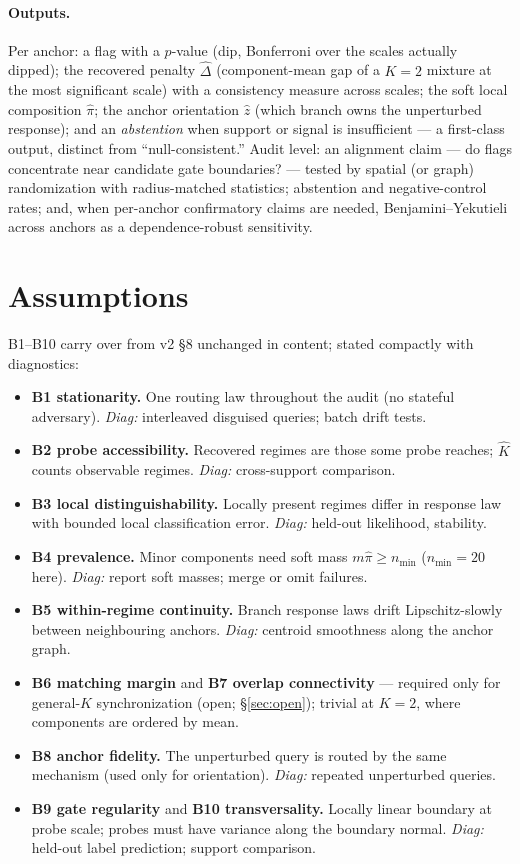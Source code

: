 \documentclass[11pt]{article}
\begin{document}
\paragraph{Outputs.}
Per anchor: a flag with a $p$-value (dip, Bonferroni over the scales actually dipped); the
recovered penalty $\widehat\Delta$ (component-mean gap of a $K{=}2$ mixture at the most
significant scale) with a consistency measure across scales; the soft local composition
$\widehat\pi$; the anchor orientation $\widehat z$ (which branch owns the unperturbed
response); and an \emph{abstention} when support or signal is insufficient --- a first-class
output, distinct from ``null-consistent.''
Audit level: an alignment claim --- do flags concentrate near candidate gate boundaries? ---
tested by spatial (or graph) randomization with radius-matched statistics; abstention and
negative-control rates; and, when per-anchor confirmatory claims are needed,
Benjamini--Yekutieli across anchors as a dependence-robust sensitivity.

\section{Assumptions}
\label{sec:assumptions}

B1--B10 carry over from v2 \S8 unchanged in content; stated compactly with diagnostics:

\begin{itemize}[leftmargin=1.8em,itemsep=1pt]
  \item \textbf{B1 stationarity.} One routing law throughout the audit (no stateful
  adversary). \emph{Diag:} interleaved disguised queries; batch drift tests.
  \item \textbf{B2 probe accessibility.} Recovered regimes are those some probe reaches;
  $\widehat K$ counts observable regimes. \emph{Diag:} cross-support comparison.
  \item \textbf{B3 local distinguishability.} Locally present regimes differ in response law
  with bounded local classification error. \emph{Diag:} held-out likelihood, stability.
  \item \textbf{B4 prevalence.} Minor components need soft mass $m\widehat\pi\ge n_{\min}$
  ($n_{\min}=20$ here). \emph{Diag:} report soft masses; merge or omit failures.
  \item \textbf{B5 within-regime continuity.} Branch response laws drift Lipschitz-slowly
  between neighbouring anchors. \emph{Diag:} centroid smoothness along the anchor graph.
  \item \textbf{B6 matching margin} and \textbf{B7 overlap connectivity} --- required only
  for general-$K$ synchronization (open; \S\ref{sec:open}); trivial at $K{=}2$, where
  components are ordered by mean.
  \item \textbf{B8 anchor fidelity.} The unperturbed query is routed by the same mechanism
  (used only for orientation). \emph{Diag:} repeated unperturbed queries.
  \item \textbf{B9 gate regularity} and \textbf{B10 transversality.} Locally linear boundary
  at probe scale; probes must have variance along the boundary normal. \emph{Diag:} held-out
  label prediction; support comparison.
\end{itemize}
\end{document}
